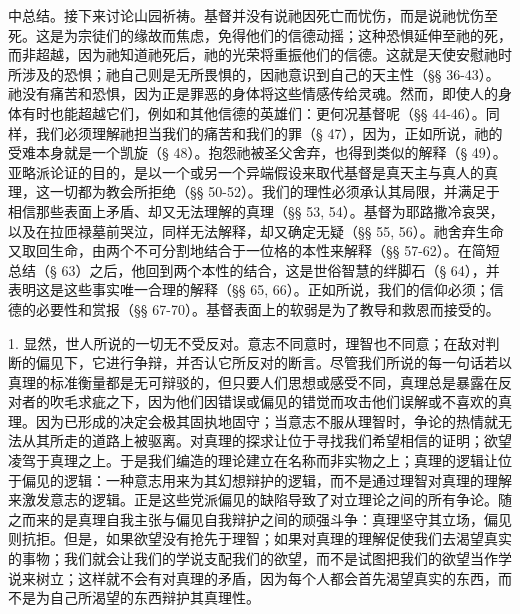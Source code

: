 中总结。接下来讨论山园祈祷。基督并没有说祂因死亡而忧伤，而是说祂忧伤至死。这是为宗徒们的缘故而焦虑，免得他们的信德动摇；这种恐惧延伸至祂的死，而非超越，因为祂知道祂死后，祂的光荣将重振他们的信德。这就是天使安慰祂时所涉及的恐惧；祂自己则是无所畏惧的，因祂意识到自己的天主性（§§ 36-43）。祂没有痛苦和恐惧，因为正是罪恶的身体将这些情感传给灵魂。然而，即使人的身体有时也能超越它们，例如和其他信德的英雄们：更何况基督呢（§§ 44-46）。同样，我们必须理解祂担当我们的痛苦和我们的罪（§ 47），因为，正如所说，祂的受难本身就是一个凯旋（§ 48）。抱怨祂被圣父舍弃，也得到类似的解释（§ 49）。亚略派论证的目的，是以一个或另一个异端假设来取代基督是真天主与真人的真理，这一切都为教会所拒绝（§§ 50-52）。我们的理性必须承认其局限，并满足于相信那些表面上矛盾、却又无法理解的真理（§§ 53, 54）。基督为耶路撒冷哀哭，以及在拉匝禄墓前哭泣，同样无法解释，却又确定无疑（§§ 55, 56）。祂舍弃生命又取回生命，由两个不可分割地结合于一位格的本性来解释（§§ 57-62）。在简短总结（§ 63）之后，他回到两个本性的结合，这是世俗智慧的绊脚石（§ 64），并表明这是这些事实唯一合理的解释（§§ 65, 66）。正如所说，我们的信仰必须；信德的必要性和赏报（§§ 67-70）。基督表面上的软弱是为了教导和救恩而接受的。\par

1. 显然，世人所说的一切无不受反对。意志不同意时，理智也不同意；在敌对判断的偏见下，它进行争辩，并否认它所反对的断言。尽管我们所说的每一句话若以真理的标准衡量都是无可辩驳的，但只要人们思想或感受不同，真理总是暴露在反对者的吹毛求疵之下，因为他们因错误或偏见的错觉而攻击他们误解或不喜欢的真理。因为已形成的决定会极其固执地固守；当意志不服从理智时，争论的热情就无法从其所走的道路上被驱离。对真理的探求让位于寻找我们希望相信的证明；欲望凌驾于真理之上。于是我们编造的理论建立在名称而非实物之上；真理的逻辑让位于偏见的逻辑：一种意志用来为其幻想辩护的逻辑，而不是通过理智对真理的理解来激发意志的逻辑。正是这些党派偏见的缺陷导致了对立理论之间的所有争论。随之而来的是真理自我主张与偏见自我辩护之间的顽强斗争：真理坚守其立场，偏见则抗拒。但是，如果欲望没有抢先于理智；如果对真理的理解促使我们去渴望真实的事物；我们就会让我们的学说支配我们的欲望，而不是试图把我们的欲望当作学说来树立；这样就不会有对真理的矛盾，因为每个人都会首先渴望真实的东西，而不是为自己所渴望的东西辩护其真理性。\par

